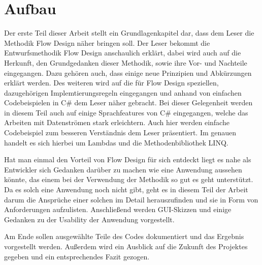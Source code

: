 \section{Aufbau}

Der erste Teil dieser Arbeit stellt ein Grundlagenkapitel dar, dass dem Leser die Methodik Flow Design näher bringen soll.
Der Leser bekommt die Entwurfsmethodik Flow Design anschaulich erklärt, dabei wird auch auf die Herkunft,
den Grundgedanken dieser Methodik, sowie ihre Vor- und Nachteile eingegangen.
Dazu gehören auch, dass einige neue Prinzipien und Abkürzungen erklärt werden.
Des weiteren wird auf die für Flow Design speziellen, dazugehörigen Implemtierungsregeln eingegangen und
anhand von einfachen Codebeispielen in C\# dem Leser näher gebracht. 
Bei dieser Gelegenheit werden in diesem Teil auch auf einige Sprachfeatures 
von C\# eingegangen, welche das Arbeiten mit Datenströmen stark erleichtern.
Auch hier werden einfache Codebeispiel zum besseren Verständnis dem Leser 
präsentiert. Im genauen handelt es sich hierbei um Lambdas und die Methodenbibliothek LINQ.

Hat man einmal den Vorteil von Flow Design für sich entdeckt liegt es nahe als
Entwickler sich Gedanken darüber zu machen wie eine Anwendung aussehen
könnte, das einem bei der Verwendung der Methodik so gut es geht unterstützt.
Da es solch eine Anwendung noch nicht gibt, geht es in diesem Teil der Arbeit
darum die Ansprüche einer solchen im Detail herauszufinden und sie
in Form von Anforderungen aufzulisten. Anschließend werden GUI-Skizzen
und einige Gedanken zu der Usability der Anwendung vorgestellt. 

Am Ende sollen ausgewählte Teile des Codes dokumentiert und das Ergebnis vorgestellt werden.
Außerdem wird ein Ausblick auf die Zukunft des Projektes gegeben und ein entsprechendes Fazit gezogen.

